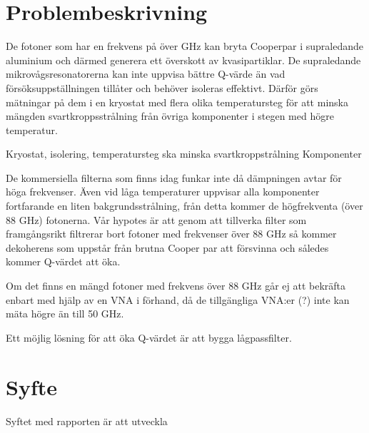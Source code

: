 \documentclass[main.tex]{subfiles}
\begin{document}
\section{Problembeskrivning}
De fotoner som har en frekvens på över \unit[88]{GHz} kan bryta Cooperpar i supraledande aluminium och därmed generera ett överskott av kvasipartiklar. De supraledande mikrovågsresonatorerna kan inte uppvisa bättre Q-värde än vad försöksuppställningen tillåter och behöver isoleras effektivt. Därför görs mätningar på dem i en kryostat med flera olika temperatursteg för att minska mängden svartkroppsstrålning från övriga komponenter i stegen med högre temperatur. 


Kryostat, isolering, temperatursteg ska minska svartkroppstrålning Komponenter

De kommersiella filterna som finns idag funkar inte då dämpningen avtar för höga frekvenser. Även vid låga temperaturer uppvisar alla komponenter fortfarande en liten bakgrundsstrålning, från detta kommer de högfrekventa (över 88 GHz) fotonerna. Vår hypotes är att genom att tillverka filter som framgångsrikt filtrerar bort fotoner med frekvenser över 88 GHz så kommer dekoherens som uppstår från brutna Cooper par att försvinna och således kommer Q-värdet att öka.


Om det finns en mängd fotoner med frekvens över 88 GHz går ej att bekräfta enbart med hjälp av en VNA i förhand, då de tillgängliga VNA:er (?) inte kan mäta högre än till 50 GHz.



Ett möjlig lösning för att öka Q-värdet är att bygga lågpassfilter. 

\section{Syfte}
Syftet med rapporten är att utveckla 

\end{document}
